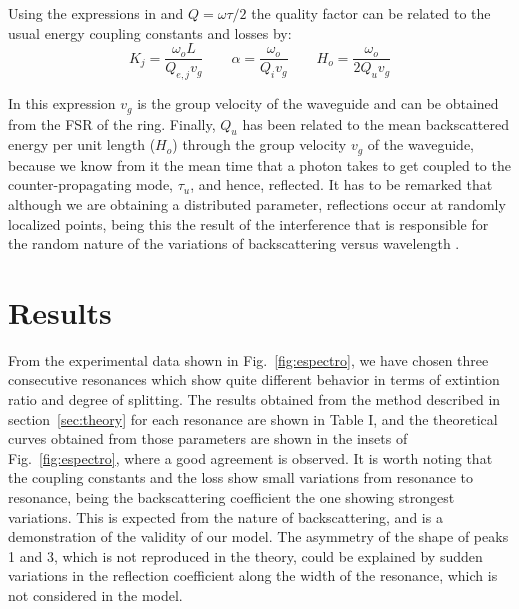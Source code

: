 \documentclass[conference,letterpaper,final]{IEEEtran}
\begin{document}
Using the expressions in \cite{BLittle97-2} and $Q=\omega\tau/2$ the quality factor can be related to the usual energy coupling constants and losses by:
\begin{equation}
    K_j=\frac{\omega_oL}{Q_{e,j} v_g}  \qquad \alpha=\frac{\omega_o}{Q_i v_g} \qquad H_o=\frac{\omega_o}{2Q_uv_g}
\end{equation}


In this expression $v_g$ is the group velocity of the waveguide and can be obtained from the FSR of the ring. Finally, $Q_u$ has been related to the mean backscattered energy per unit length ($H_o$) through the group velocity $v_g$ of the waveguide, because we know from it the mean time that a photon takes to get coupled to the counter-propagating mode, $\tau_u$, and hence, reflected. It has to be remarked that although we are obtaining a distributed parameter, reflections occur at randomly localized points, being this the result of the interference that is responsible for the random nature of the variations of backscattering versus wavelength \cite{stat_backscattering}.




\section{Results}

From the experimental data shown in Fig.~\ref{fig:espectro}, we have chosen three consecutive resonances which show quite different behavior in terms of extintion ratio and degree of splitting. The results obtained from the method described in section~\ref{sec:theory} for each resonance are shown in Table I, and the theoretical curves obtained from those parameters are shown in the insets of Fig.~\ref{fig:espectro}, where a good agreement is observed. It is worth noting that the coupling constants and the loss show small variations from resonance to resonance, being the backscattering coefficient the one showing strongest variations. This is expected from the nature of backscattering, and is a demonstration of the validity of our model. The asymmetry of the shape of peaks 1 and 3, which is not reproduced in the theory, could be explained by sudden variations in the reflection coefficient along the width of the resonance, which is not considered in the model.
\end{document}
